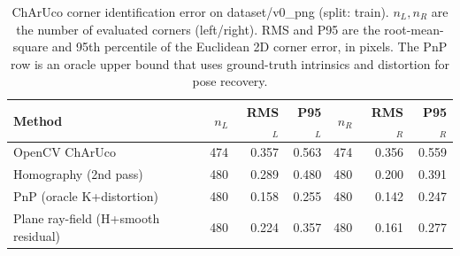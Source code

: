 \begin{table}[H]
\centering
\small
\begin{tabular}{lrrrrrr}
\toprule
Method & $n_L$ & RMS$_L$ & P95$_L$ & $n_R$ & RMS$_R$ & P95$_R$\\
\midrule
OpenCV ChArUco & 474 & 0.357 & 0.563 & 474 & 0.356 & 0.559\\
Homography (2nd pass) & 480 & 0.289 & 0.480 & 480 & 0.200 & 0.391\\
PnP (oracle K+distortion) & 480 & 0.158 & 0.255 & 480 & 0.142 & 0.247\\
Plane ray-field (H+smooth residual) & 480 & 0.224 & 0.357 & 480 & 0.161 & 0.277\\
\bottomrule
\end{tabular}
\caption{ChArUco corner identification error on dataset/v0\_png (split: train). $n_L,n_R$ are the number of evaluated corners (left/right). RMS and P95 are the root-mean-square and 95th percentile of the Euclidean 2D corner error, in pixels. The PnP row is an oracle upper bound that uses ground-truth intrinsics and distortion for pose recovery.}
\label{tab:charuco_methods}
\end{table}
